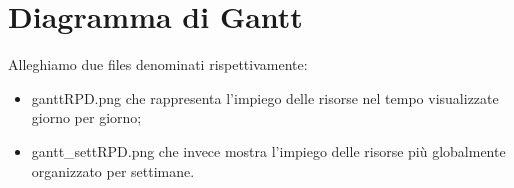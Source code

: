 \documentclass[11pt,titlepage,a4paper]{report}
\begin{document}
\chapter{Diagramma di Gantt}
Alleghiamo due files denominati rispettivamente:
\begin {itemize} 
\item ganttRPD.png che rappresenta l'impiego delle risorse nel tempo visualizzate giorno per giorno;
\item gantt\_settRPD.png che invece mostra l'impiego delle risorse pi\`u globalmente organizzato per settimane.
\end{itemize}
\end{document}
